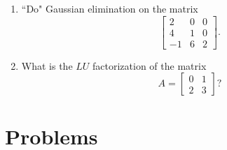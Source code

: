 \documentclass[11pt]{article}
\begin{document}
\begin{enumerate}
\item ``Do" Gaussian elimination on the matrix
\[ \begin{bmatrix} 2 & 0 & 0 \\ 4 & 1 & 0 \\ -1 & 6 & 2 \end{bmatrix}.\]

\item What is the $LU$ factorization of the matrix
\[A = \begin{bmatrix} 0 & 1 \\ 2 & 3 \end{bmatrix}? \]

\end{enumerate}

\section{Problems}
\end{document}
